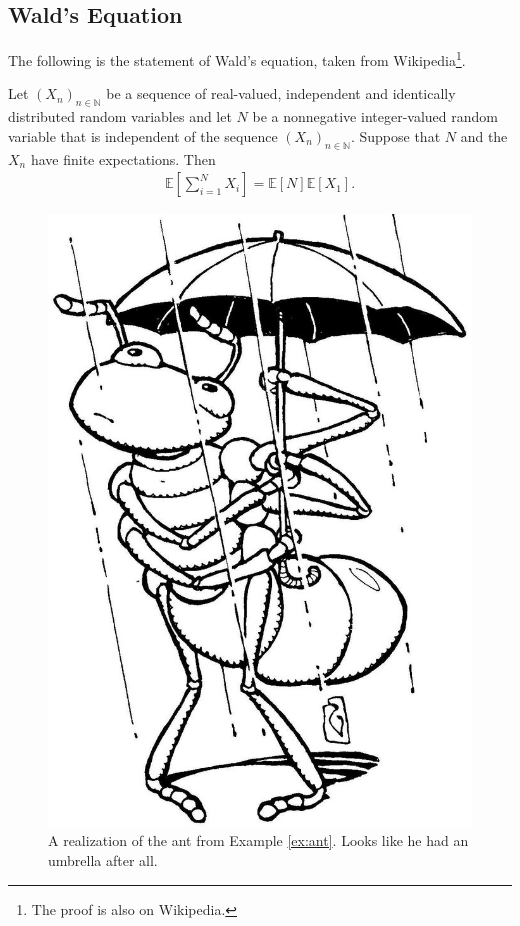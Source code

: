 \documentclass[11pt]{article}
\begin{document}
\subsection{Wald's Equation}
The following is the statement of Wald's equation, taken from Wikipedia\footnote{The proof is also on Wikipedia.}.
\begin{theorem}
	Let $(X_n)_{n\in\mathbb{N}}$ be a sequence of real-valued, independent and identically distributed random variables and let $N$ be a nonnegative integer-valued random variable that is independent of the sequence $(X_n)_{n\in\mathbb{N}}$. Suppose that $N$ and the $X_n$ have finite expectations. Then
	\begin{align}\label{eq:wald}
		\mathbb{E}\left[ \sum_{i=1}^N X_i \right] = \mathbb{E}\left[N \right]\mathbb{E}\left[ X_1\right].
	\end{align}
\end{theorem}
\begin{figure}
	\centering
	\label{fig:rainant}
	\caption{A realization of the ant from Example \ref{ex:ant}. Looks like he had an umbrella after all.}
	\includegraphics[width=0.7\linewidth]{rain_ant}
\end{figure}
\end{document}
